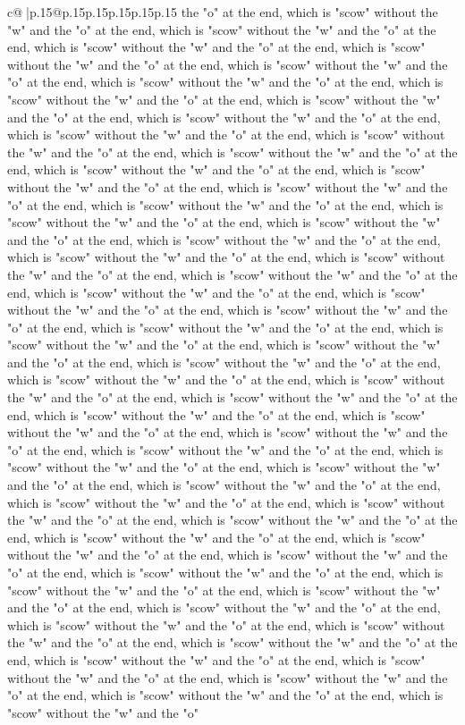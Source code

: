 \documentclass{article}
\begin{document}
{\begin{supertabular}{c@{$\;$}|p{.15\linewidth}@{}p{.15\linewidth}p{.15\linewidth}p{.15\linewidth}p{.15\linewidth}p{.15\linewidth}}
{{{the "o" at the end, which is "scow" without the "w" and the "o" at the end, which is "scow" without the "w" and the "o" at the end, which is "scow" without the "w" and the "o" at the end, which is "scow" without the "w" and the "o" at the end, which is "scow" without the "w" and the "o" at the end, which is "scow" without the "w" and the "o" at the end, which is "scow" without the "w" and the "o" at the end, which is "scow" without the "w" and the "o" at the end, which is "scow" without the "w" and the "o" at the end, which is "scow" without the "w" and the "o" at the end, which is "scow" without the "w" and the "o" at the end, which is "scow" without the "w" and the "o" at the end, which is "scow" without the "w" and the "o" at the end, which is "scow" without the "w" and the "o" at the end, which is "scow" without the "w" and the "o" at the end, which is "scow" without the "w" and the "o" at the end, which is "scow" without the "w" and the "o" at the end, which is "scow" without the "w" and the "o" at the end, which is "scow" without the "w" and the "o" at the end, which is "scow" without the "w" and the "o" at the end, which is "scow" without the "w" and the "o" at the end, which is "scow" without the "w" and the "o" at the end, which is "scow" without the "w" and the "o" at the end, which is "scow" without the "w" and the "o" at the end, which is "scow" without the "w" and the "o" at the end, which is "scow" without the "w" and the "o" at the end, which is "scow" without the "w" and the "o" at the end, which is "scow" without the "w" and the "o" at the end, which is "scow" without the "w" and the "o" at the end, which is "scow" without the "w" and the "o" at the end, which is "scow" without the "w" and the "o" at the end, which is "scow" without the "w" and the "o" at the end, which is "scow" without the "w" and the "o" at the end, which is "scow" without the "w" and the "o" at the end, which is "scow" without the "w" and the "o" at the end, which is "scow" without the "w" and the "o" at the end, which is "scow" without the "w" and the "o" at the end, which is "scow" without the "w" and the "o" at the end, which is "scow" without the "w" and the "o" at the end, which is "scow" without the "w" and the "o" at the end, which is "scow" without the "w" and the "o" at the end, which is "scow" without the "w" and the "o" at the end, which is "scow" without the "w" and the "o" at the end, which is "scow" without the "w" and the "o" at the end, which is "scow" without the "w" and the "o" at the end, which is "scow" without the "w" and the "o" at the end, which is "scow" without the "w" and the "o" at the end, which is "scow" without the "w" and the "o" at the end, which is "scow" without the "w" and the "o" at the end, which is "scow" without the "w" and the "o" at the end, which is "scow" without the "w" and the "o" at the end, which is "scow" without the "w" and the "o" at the end, which is "scow" without the "w" and the "o" at the end, which is "scow" without the "w" and the "o" at the end, which is "scow" without the "w" and the "o" at the end, which is "scow" without the "w" and the "o" at the end, which is "scow" without the "w" and the "o" }}}
\end{supertabular}}
\end{document}
